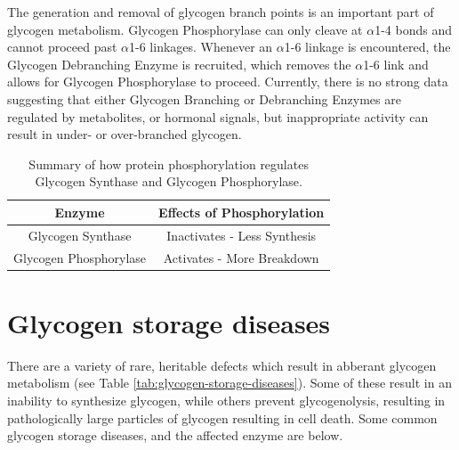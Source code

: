 \documentclass{tufte-handout}
\begin{document}
The generation and removal of glycogen branch points is an important part of glycogen metabolism.  Glycogen Phosphorylase can only cleave at $\alpha$1-4 bonds and cannot proceed past $\alpha$1-6 linkages.  Whenever an $\alpha$1-6 linkage is encountered, the Glycogen Debranching Enzyme is recruited, which removes the $\alpha$1-6 link and allows for Glycogen Phosphorylase to proceed.  Currently, there is no strong data suggesting that either Glycogen Branching or Debranching Enzymes are regulated by metabolites, or hormonal signals, but inappropriate activity can result in under- or over-branched glycogen.


\begin{table}
\centering
\caption{Summary of how protein phosphorylation regulates Glycogen Synthase and Glycogen Phosphorylase.}
\label{tab:gs-gp-phosphorylation}
\begin{tabular}{cc}
\hline
\textbf {Enzyme} & \textbf{Effects of Phosphorylation}  \\
\hline
Glycogen Synthase & Inactivates - Less Synthesis \\
Glycogen Phosphorylase & Activates - More Breakdown\\
\hline
\end{tabular}
\end{table}

\section{Glycogen storage diseases}

There are a variety of rare, heritable defects which result in abberant glycogen metabolism (see Table \ref{tab:glycogen-storage-diseases}).  Some of these result in an inability to synthesize glycogen, while others prevent glycogenolysis, resulting in pathologically large particles of glycogen resulting in cell death.  Some common glycogen storage diseases, and the affected enzyme are below.   
\end{document}
